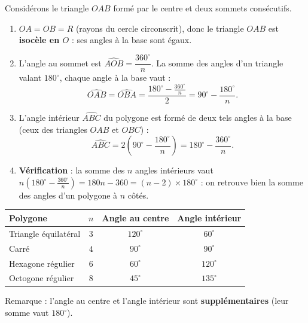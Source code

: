 \documentclass[11pt]{article}
\begin{document}
\begin{experience}
Considérons le triangle $OAB$ formé par le centre et deux sommets consécutifs.
\begin{enumerate}
\item $OA = OB = R$ (rayons du cercle circonscrit), donc le triangle $OAB$ est \textbf{isocèle en $O$} : ses angles à la base sont égaux.
\item L'angle au sommet est $\widehat{AOB} = \dfrac{360^\circ}{n}$. La somme des angles d'un triangle valant $180^\circ$, chaque angle à la base vaut :
\[ \widehat{OAB} = \widehat{OBA} = \frac{180^\circ - \frac{360^\circ}{n}}{2} = 90^\circ - \frac{180^\circ}{n}. \]
\item L'angle intérieur $\widehat{ABC}$ du polygone est formé de deux tels angles à la base (ceux des triangles $OAB$ et $OBC$) :
\[ \widehat{ABC} = 2\left(90^\circ - \frac{180^\circ}{n}\right) = 180^\circ - \frac{360^\circ}{n}. \]
\item \textbf{Vérification} : la somme des $n$ angles intérieurs vaut $n\left(180^\circ - \frac{360^\circ}{n}\right) = 180n - 360 = (n-2)\times 180^\circ$ : on retrouve bien la somme des angles d'un polygone à $n$ côtés.
\end{enumerate}
\end{experience}

\begin{aretenir}
\begin{center}
\begin{tabular}{|l|c|c|c|}
\hline
\rowcolor{popblueL} Polygone & $n$ & Angle au centre & Angle intérieur \\
\hline
Triangle équilatéral & $3$ & $120^\circ$ & $60^\circ$ \\
\hline
Carré & $4$ & $90^\circ$ & $90^\circ$ \\
\hline
Hexagone régulier & $6$ & $60^\circ$ & $120^\circ$ \\
\hline
Octogone régulier & $8$ & $45^\circ$ & $135^\circ$ \\
\hline
\end{tabular}
\end{center}
Remarque : l'angle au centre et l'angle intérieur sont \textbf{supplémentaires} (leur somme vaut $180^\circ$).
\end{aretenir}
\end{document}
